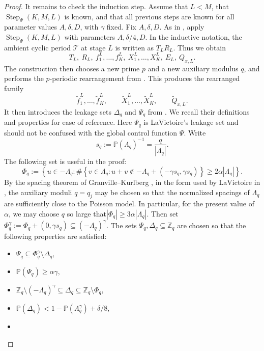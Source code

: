 \documentclass[12pt,leqno]{amsart}
\newcounter{counter}
\newcounter{counter2}
\numberwithin{equation}{section}
\numberwithin{counter2}{section}
\newcounter{theorem}
\theoremstyle{definition}
\theoremstyle{plain}
\begin{document}
\begin{proof}
It remains to check the induction step. Assume that \(L<M\), that
\(\operatorname{Step}_{\Psi}(K,M,L)\) is known, and that all previous steps are
known for all parameter values \(A,\delta,D\), with \(\gamma\) fixed. Fix
\(A,\delta,D\). As in \cite[Section~8]{L9}, apply
\(\operatorname{Step}_{\Psi}(K,M,L)\) with parameters \(A,\delta/4,D\). In the
inductive notation, the ambient cyclic period \(\mathcal T\) at stage \(L\) is
written as \(T_LR_L\). Thus we obtain
\[
T_L,\ R_L,\ f_1^L,\dots,f_K^L,\ X_1^L,\dots,X_K^L,\ E_L,\ Q_{x,L}.
\]
	The construction then chooses a new prime \(p\) and a new auxiliary modulus
\(q\), and performs the \(p\)-periodic rearrangement from
\cite[Section~5]{L9}. This produces the rearranged family
\[
\widetilde f_1^L,\dots,\widetilde f_K^L,
\qquad
\widetilde X_1^L,\dots,\widetilde X_K^L,
\qquad
\widetilde Q_{x,L}.
\]
It then introduces the leakage sets \(\Delta_q\) and \(\Psi_q\) from
\cite[Section~6]{L9}. We recall their definitions and properties for ease of
reference. Here \(\Psi_q\) is LaVictoire's leakage set and should not be confused
	with the global control function \(\Psi\).
	Write
	\[
	s_q:=\mathbb P(\Lambda_q)^{-1}=\frac{q}{|\Lambda_q|}.
	\]
	The following set is useful in the proof: 
	\[
	\Phi_q
	:=
	\left\{
	u\in-\Lambda_q:
	\#\left\{
	v\in\Lambda_q:
	u+v\notin -\Lambda_q+(-\gamma s_q,\gamma s_q)
	\right\}
	\geq
	2\alpha|\Lambda_q|
	\right\}.
	\]
	By the spacing theorem of Granville--Kurlberg \cite[Corollary 2]{GK08}, in the form used by
	LaVictoire in \cite[(3.4)]{L9}, the auxiliary moduli \(q=q_j\) may be chosen so
	that the normalized spacings of \(\Lambda_q\) are sufficiently close to the
	Poisson model. In particular, for the present value of \(\alpha\), we may choose
	\(q\) so large that$	|\Phi_q|\geq 3\alpha|\Lambda_q|.$ Then set $	\Phi_q^\gamma:=\Phi_q+(0,\gamma s_q)\subseteq (-\Lambda_q)^\gamma .$ The sets \(\Psi_q,\Delta_q\subseteq\mathbb Z_q\) are chosen so that the following properties are satisfied:
	
\begin{itemize}
	 \item $\Psi_q\subseteq\Phi_q^\gamma\setminus\Delta_q,$
	\item
	$\mathbb P(\Psi_q)\geq \alpha\gamma,$
	
\item 
$	\mathbb Z_q\setminus(-\Lambda_q)^\gamma
	\subseteq
	\Delta_q
	\subseteq
	\mathbb Z_q\setminus\Phi_q,
	$

\item
$	\mathbb P(\Delta_q)
	<
	1-\mathbb P(\Lambda_q^\gamma)+\delta/8,
	$
\item 


\end{itemize}
\end{proof}
\end{document}

